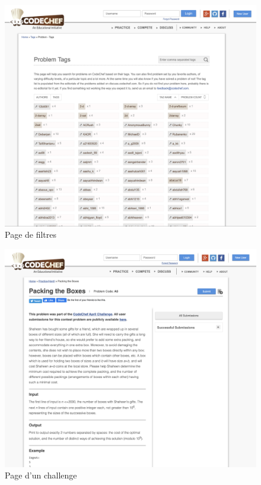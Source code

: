 \begin{figure}[H]
    \includegraphics[width=\textwidth,height=0.35\textheight,keepaspectratio]{images/comparison/codechef-2.png}
    \centering
    \caption[Codechef : page de filtres]{Page de filtres}
\end{figure}

\begin{figure}[H]
    \includegraphics[width=\textwidth,height=0.35\textheight,keepaspectratio]{images/comparison/codechef-3.png}
    \centering
    \caption[Codechef : page d'un challenge]{Page d'un challenge}
\end{figure}

